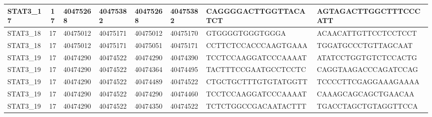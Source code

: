\begin{landscape}
\begin{longtable}{| p{} | p{} | p{} | p{} | p{} | p{} | p{} | p{} |}
\multicolumn{1}{|l|}{STAT3\_17}  & \multicolumn{1}{c|}{17} & \multicolumn{1}{l|}{40475268}  & \multicolumn{1}{l|}{40475382}  & \multicolumn{1}{l|}{40475268}  & \multicolumn{1}{l|}{40475382}  & \multicolumn{1}{l|}{CAGGGGACTTGGTTACATCT}            & \multicolumn{1}{l|}{AGTAGACTTGGCTTTCCCATT}         \\ \hline
\multicolumn{1}{|l|}{STAT3\_18}  & \multicolumn{1}{c|}{17} & \multicolumn{1}{l|}{40475012}  & \multicolumn{1}{l|}{40475171}  & \multicolumn{1}{l|}{40475012}  & \multicolumn{1}{l|}{40475170}  & \multicolumn{1}{l|}{GTGGGGTGGGTGGGA}                 & \multicolumn{1}{l|}{ACAACATTGTTCCTCCTCCT}          \\ \hline
\multicolumn{1}{|l|}{STAT3\_18}  & \multicolumn{1}{c|}{17} & \multicolumn{1}{l|}{40475012}  & \multicolumn{1}{l|}{40475171}  & \multicolumn{1}{l|}{40475051}  & \multicolumn{1}{l|}{40475171}  & \multicolumn{1}{l|}{CCTTCTCCACCCAAGTGAAA}            & \multicolumn{1}{l|}{TGGATGCCCTGTTAGCAAT}           \\ \hline
\multicolumn{1}{|l|}{STAT3\_19}  & \multicolumn{1}{c|}{17} & \multicolumn{1}{l|}{40474290}  & \multicolumn{1}{l|}{40474522}  & \multicolumn{1}{l|}{40474290}  & \multicolumn{1}{l|}{40474390}  & \multicolumn{1}{l|}{TCCTCCAAGGATCCCAAAAT}            & \multicolumn{1}{l|}{ATATCCTGGTGTCTCCACTG}          \\ \hline
\multicolumn{1}{|l|}{STAT3\_19}  & \multicolumn{1}{c|}{17} & \multicolumn{1}{l|}{40474290}  & \multicolumn{1}{l|}{40474522}  & \multicolumn{1}{l|}{40474364}  & \multicolumn{1}{l|}{40474495}  & \multicolumn{1}{l|}{TACTTTCCGAATGCCTCCTC}            & \multicolumn{1}{l|}{CAGGTAAGACCCAGATCCAG}          \\ \hline
\multicolumn{1}{|l|}{STAT3\_19}  & \multicolumn{1}{c|}{17} & \multicolumn{1}{l|}{40474290}  & \multicolumn{1}{l|}{40474522}  & \multicolumn{1}{l|}{40474489}  & \multicolumn{1}{l|}{40474522}  & \multicolumn{1}{l|}{CTGCTGCTTTGTGTATGGTT}            & \multicolumn{1}{l|}{TCCCCTTCGAGGAAAGAAAA}          \\ \hline
\multicolumn{1}{|l|}{STAT3\_19}  & \multicolumn{1}{c|}{17} & \multicolumn{1}{l|}{40474290}  & \multicolumn{1}{l|}{40474522}  & \multicolumn{1}{l|}{40474290}  & \multicolumn{1}{l|}{40474460}  & \multicolumn{1}{l|}{TCCTCCAAGGATCCCAAAAT}            & \multicolumn{1}{l|}{CAAAGCAGCAGCTGAACAA}           \\ \hline
\multicolumn{1}{|l|}{STAT3\_19}  & \multicolumn{1}{c|}{17} & \multicolumn{1}{l|}{40474290}  & \multicolumn{1}{l|}{40474522}  & \multicolumn{1}{l|}{40474350}  & \multicolumn{1}{l|}{40474522}  & \multicolumn{1}{l|}{TCTCTGGCCGACAATACTTT}            & \multicolumn{1}{l|}{TGACCTAGCTGTAGGTTCCA}          \\ \hline

\end{longtable}
\end{landscape}
